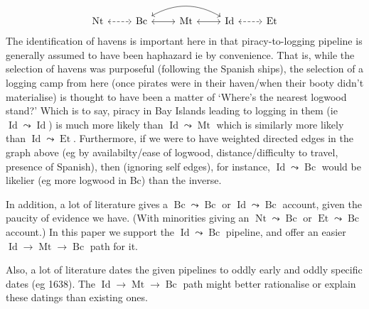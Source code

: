 \documentclass{amsart}
\DeclareMathOperator{\id}{Id}%
\DeclareMathOperator{\mt}{Mt}%
\DeclareMathOperator{\bc}{Bc}%
\DeclareMathOperator{\et}{Et}%
\DeclareMathOperator{\nt}{Nt}%
\theoremstyle{definition}%
\theoremstyle{definition}%
\theoremstyle{remark}%
\begin{document}
%
\begin{equation}
\label{graph:prop}%
\begin{tikzcd}[arrows=leftrightarrow]
\nt \rar[dashed] &\bc \rar \ar[rr,bend left] &\mt \rar &\id \rar[dashed] &\et
\end{tikzcd}
\end{equation}
%
The identification of havens is important here in that piracy-to-logging pipeline is generally assumed to have been haphazard ie by convenience. That is, while the selection of havens was purposeful (following the Spanish ships), the selection of a logging camp from here (once pirates were in their haven/when their booty didn't materialise) is thought to have been a matter of `Where's the nearest logwood stand?' %
Which is to say, piracy in Bay Islands leading to logging in them (ie \(\id\leadsto\id\)) is much more likely than \(\id\leadsto\mt\) which is similarly more likely than 
\(\id\leadsto\et\). Furthermore, if we were to have weighted directed edges in the graph above (eg by availabilty/ease of logwood, distance/difficulty to travel, presence of Spanish), then (ignoring self edges), for instance, \(\id\leadsto\bc\) would be likelier (eg more logwood in Bc) than the inverse.

In addition, a lot of literature gives a \(\bc\leadsto\bc\) or \(\id\leadsto\bc\) account, given the paucity of evidence we have. (With minorities giving an \(\nt\leadsto\bc\) or \(\et\leadsto\bc\) account.) In this paper we support the \(\id\leadsto\bc\) pipeline, and offer an easier \(\id\to\mt\to\bc\) path for it.

Also, a lot of literature dates the given pipelines to oddly early and oddly specific dates (eg 1638). The \(\id\to\mt\to\bc\) path might better rationalise or explain these datings than existing ones.
%
%
%
%
\end{document}
